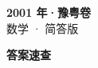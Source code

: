 \documentclass[zihao=-4, a4paper]{ctexart}
\begin{document}
\begin{center}
  {\Large\bfseries 2001 年·豫粤卷}\\[4pt]
  {\large 数学 · 简答版}
\end{center}
\medskip
{}

\clearpage
{}
\begin{center}{\Large\bfseries 答案速查}\end{center}
\medskip

\end{document}

